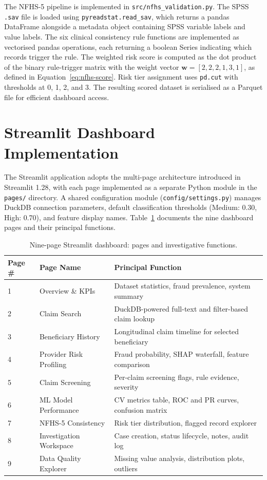 The NFHS-5 pipeline is implemented in \texttt{src/nfhs\_validation.py}. The SPSS \texttt{.sav} file is loaded using \texttt{pyreadstat.read\_sav}, which returns a pandas DataFrame alongside a metadata object containing SPSS variable labels and value labels. The six clinical consistency rule functions are implemented as vectorised pandas operations, each returning a boolean Series indicating which records trigger the rule. The weighted risk score is computed as the dot product of the binary rule-trigger matrix with the weight vector $\mathbf{w} = [2, 2, 2, 1, 3, 1]$, as defined in Equation~\ref{eq:nfhs-score}. Risk tier assignment uses \texttt{pd.cut} with thresholds at 0, 1, 2, and 3. The resulting scored dataset is serialised as a Parquet file for efficient dashboard access.

\section{Streamlit Dashboard Implementation}
\label{sec:impl-dashboard}

The Streamlit application adopts the multi-page architecture introduced in Streamlit 1.28, with each page implemented as a separate Python module in the \texttt{pages/} directory. A shared configuration module (\texttt{config/settings.py}) manages DuckDB connection parameters, default classification thresholds (Medium: 0.30, High: 0.70), and feature display names. Table~\ref{tab:dashboard-pages} documents the nine dashboard pages and their principal functions.

\begin{table}[htbp]
\centering
\caption{Nine-page Streamlit dashboard: pages and investigative functions.}
\label{tab:dashboard-pages}
\begin{tabular}{@{}lll@{}}
\toprule
\textbf{Page \#} & \textbf{Page Name} & \textbf{Principal Function} \\
\midrule
1 & Overview \& KPIs          & Dataset statistics, fraud prevalence, system summary \\
2 & Claim Search              & DuckDB-powered full-text and filter-based claim lookup \\
3 & Beneficiary History       & Longitudinal claim timeline for selected beneficiary \\
4 & Provider Risk Profiling   & Fraud probability, SHAP waterfall, feature comparison \\
5 & Claim Screening           & Per-claim screening flags, rule evidence, severity \\
6 & ML Model Performance      & CV metrics table, ROC and PR curves, confusion matrix \\
7 & NFHS-5 Consistency        & Risk tier distribution, flagged record explorer \\
8 & Investigation Workspace   & Case creation, status lifecycle, notes, audit log \\
9 & Data Quality Explorer     & Missing value analysis, distribution plots, outliers \\
\bottomrule
\end{tabular}
\end{table}

